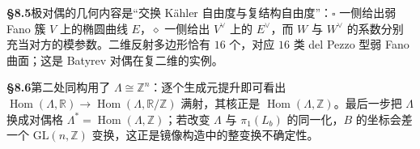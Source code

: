 \noindent\textbf{§8.5}\quad 极对偶的几何内容是“交换 Kähler 自由度与复结构自由度”：$\square$ 一侧给出弱 Fano 簇 $V$ 上的椭圆曲线 $E$，$\diamond$ 一侧给出 $V^\vee$ 上的 $E^\vee$，而 $W$ 与 $W^\vee$ 的系数分别充当对方的模参数。二维反射多边形恰有 $16$ 个，对应 $16$ 类 del Pezzo 型弱 Fano 曲面；这是 Batyrev 对偶在复二维的实例。\par\medskip
\noindent\textbf{§8.6}\quad 第二处同构用了 $\Lambda\cong\mathbb Z^n$：逐个生成元提升即可看出 $\operatorname{Hom}(\Lambda,\mathbb R)\to\operatorname{Hom}(\Lambda,\mathbb R/\mathbb Z)$ 满射，其核正是 $\operatorname{Hom}(\Lambda,\mathbb Z)$。最后一步把 $\Lambda$ 换成对偶格 $\Lambda^*=\operatorname{Hom}(\Lambda,\mathbb Z)$；若改变 $\Lambda$ 与 $\pi_1(L_b)$ 的同一化，$B$ 的坐标会差一个 $\mathrm{GL}(n,\mathbb Z)$ 变换，这正是镜像构造中的整变换不确定性。\par\medskip
